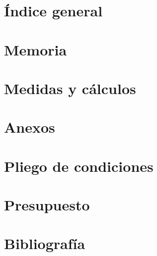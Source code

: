 \documentclass[a4paper,titlepage,10pt,oneside]{report}
\begin{document}
\DOpresetDOtitlepg

\dominitoc[e]
\dominilof[e]
\dominilot[e]

\chapter{Índice general} \DOtls
\tableofcontents
\chapter{Memoria}

\pagestyle{empty}\pagestyle{body}

\fancyhead[L]{\slshape \nouppercase{\contentsname}}
\section*{\contentsname} 
\minitoc \clearpage

\fancyhead[L]{\slshape \nouppercase{\listfigurename}}
\section*{\listfigurename} 
\minilof \clearpage


\label{lic}



\chapter{Medidas y cálculos}%

\chapter{Anexos} %
{}

\chapter{Pliego de condiciones} %

\chapter{Presupuesto}

\nocite{*}
\chapter{Bibliografía}
%
\fancyhead[L]{\slshape \nouppercase{\bibname}}
%
\printbibliography
\end{document}
